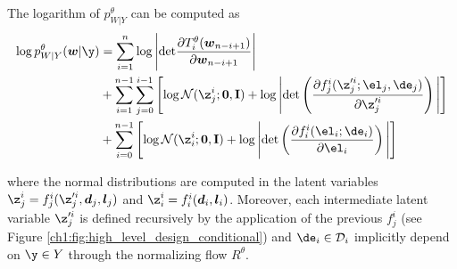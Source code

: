 \begin{proposition}
    The logarithm of $p^\theta_{W|Y}$ can be computed as
    \begin{align}
    \log p^\theta_{W|Y}(\boldsymbol{w} | \y)   & = \sum_{i=1}^{n}\log{\Bigg|{\rm det}\frac{\partial T_i^{\theta}(\boldsymbol{w}_{n-i+1})}{\partial \boldsymbol{w}_{n-i+1}}\Bigg|} \nonumber \\ 
    & + \sum_{i=1}^{n-1} \sum^{i-1}_{j=0} \left[\log \mathcal{N}(\z_j^i;\textbf{0},\textbf{I})+\log \Bigg|{\rm det}\left(\frac{\partial f^i_{j}(\z_j^{\prime i};\el_j,\de_{j})}{\partial \z_j^{\prime i}}\right)\Bigg|\right] \nonumber\\
    & + \sum_{i=0}^{n-1}  \left[\log \mathcal{N}(\z_i^i;\textbf{0},\textbf{I})+\log \Bigg|{\rm det}\left(\frac{\partial f^i_{i}(\el_{i};\de_{i})}{\partial \el_{i}}\right)\Bigg|\right]\label{ch1:eq:obj}
    \end{align} 
    
    where the normal distributions are computed in the latent variables $\z_j^i = f_j^i(\z_j^{\prime i}, \boldsymbol{d}_j,\boldsymbol{l}_j)$ and $\z_i^i = f_i^i( \boldsymbol{d}_i,\boldsymbol{l}_i)$. Moreover, each intermediate latent variable $\z_j^{\prime i}$ is defined recursively by the application of the previous $f_j^i$ (see Figure \ref{ch1:fig:high_level_design_conditional}) and ${\de}_{i} \in \mathcal{D}_{i}$ implicitly depend on $\y \in Y$ through the normalizing flow $R^\theta$. 
    
\end{proposition}

